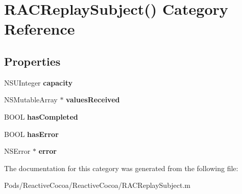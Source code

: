 \hypertarget{category_r_a_c_replay_subject_07_08}{}\section{R\+A\+C\+Replay\+Subject() Category Reference}
\label{category_r_a_c_replay_subject_07_08}
\subsection*{Properties}
\begin{DoxyCompactItemize}
\item 
\mbox{\label{category_r_a_c_replay_subject_07_08_a0476e165b7e0d2f09319c23dbecf517c}} 
N\+S\+U\+Integer {\bfseries capacity}
\item 
\mbox{\label{category_r_a_c_replay_subject_07_08_ae1463e3aa2f5a63b5252b3ecf486260d}} 
N\+S\+Mutable\+Array $\ast$ {\bfseries values\+Received}
\item 
\mbox{\label{category_r_a_c_replay_subject_07_08_a7d57b08b5d003f74739eda7e058c166b}} 
B\+O\+OL {\bfseries has\+Completed}
\item 
\mbox{\label{category_r_a_c_replay_subject_07_08_a4c871bd8236219235343c2f7749d2e71}} 
B\+O\+OL {\bfseries has\+Error}
\item 
\mbox{\label{category_r_a_c_replay_subject_07_08_a5661adcd0937bc6ee89f05ae7e9cf778}} 
N\+S\+Error $\ast$ {\bfseries error}
\end{DoxyCompactItemize}


The documentation for this category was generated from the following file\+:\begin{DoxyCompactItemize}
\item 
Pods/\+Reactive\+Cocoa/\+Reactive\+Cocoa/R\+A\+C\+Replay\+Subject.\+m\end{DoxyCompactItemize}
